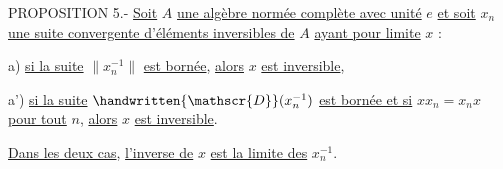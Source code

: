 PROPOSITION 5.- \uline{Soit} $A$ \uline{une algèbre normée complète avec unité} $e$ \uline{et soit} $x_n$ \uline{une suite convergente d'éléments inversibles de} $A$ \uline{ayant pour limite} $x$ :

a) \uline{si la suite} $\lVert x_n^{-1}\rVert$ \uline{est bornée}, \uline{alors} $x$ \uline{est inversible},

a') \uline{si la suite} $\handwritten{\mathscr{D}}(x_n^{-1})$ \uline{est bornée et si} $xx_n=x_nx$ \uline{pour tout} $n$, \uline{alors} $x$ \uline{est inversible}.

\uline{Dans les deux cas}, \uline{l'inverse de} $x$ \uline{est la limite des} $x_n^{-1}$.

